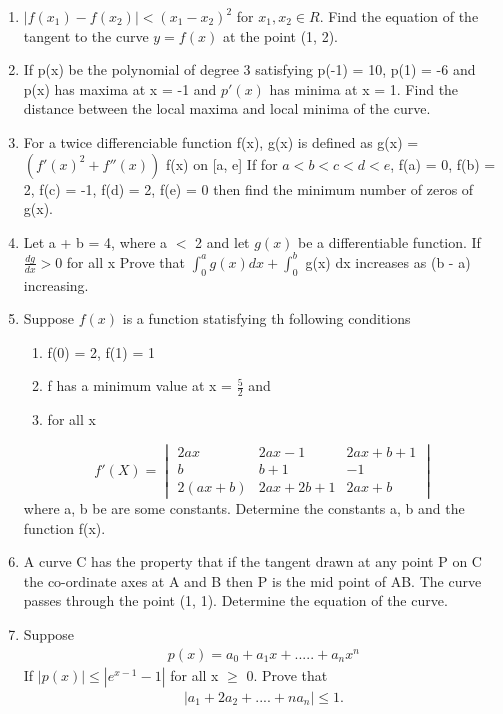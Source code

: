 \begin{enumerate}[label=\arabic*.,ref=\thesubsection.\theenumi]
\item $|f(x_1) - f(x_2)| < (x_1 - x_2)^2$ for $x_1, x_2 \in R$. Find the equation of the tangent to the curve $y = f(x)$ at the point (1, 2).

\item If p(x) be the polynomial of degree 3 satisfying p(-1) = 10, p(1) = -6 and p(x) has maxima at x = -1
and $p'(x)$ has minima at x = 1. Find the distance between the local maxima and local minima of the curve.

\item For a twice differenciable function f(x), g(x) is defined as g(x) = $(f'(x)^2 + f''(x))$ f(x) on [a, e] If for $a < b < c < d < e$, f(a) = 0, f(b) = 2, f(c) = -1, f(d) = 2, f(e) = 0 then find the minimum number of zeros of g(x).

\item Let a + b = 4, where a $<$ 2 and let $g(x)$ be a differentiable function. If $\frac{dg}{dx} > 0$ for all x Prove that $\int_{0}^{a} g(x) dx + \int_{0}^{b}$ g(x) dx increases as (b - a) increasing.

\item Suppose $f(x)$ is a function statisfying th following conditions 
\begin{enumerate}
\item f(0) = 2, f(1) = 1
\item f has a minimum value at x = $\frac{5}{2}$ and 
\item for all x
\end{enumerate}
\[
f'(X) =
\begin{vmatrix}
2ax & 2ax - 1 & 2ax + b + 1  \\ 
b & b + 1 & -1  \\
2(ax + b) & 2ax + 2b + 1 & 2ax + b 
\end{vmatrix}
\]
where a, b be are some constants. Determine the constants a, b and the function f(x).

\item A  curve C has the property that if the tangent drawn at any point P on C the co-ordinate axes at A and B then P is the mid point of AB. The curve passes through the point (1, 1). Determine the equation of the curve.

\item Suppose
\begin{align*} 
p(x) = a_0 + a_1x + ..... + a_nx^n
\end{align*} 
If $|p(x)|\leq |e^{x - 1} - 1|$ for all x $\geq$ 0. Prove that 
\begin{align*}
|a_1 + 2a_2 + ....+na_n| \leq 1.
\end{align*}


\end{enumerate}

